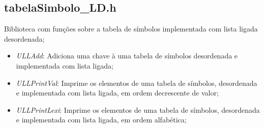 \documentclass[12pt, a4paper]{article} %
\begin{document}
	\subsection{tabelaSimbolo\_LD.h}
	Biblioteca com funções sobre a tabela de símbolos implementada com lista ligada desordenada;
	\begin{itemize}
		\item \textit{ULLAdd}: Adiciona uma chave à uma tabela de símbolos desordenada e implementada com lista ligada;
		\item \textit{ULLPrintVal}: Imprime os elementos de uma tabela de símbolos, desordenada e implementada com lista ligada, em ordem decrescente de valor;
		\item \textit{ULLPrintLexi}: Imprime os elementos de uma tabela de símbolos, desordenada e implementada com lista ligada, em ordem alfabética; 
	\end{itemize}
\end{document}

